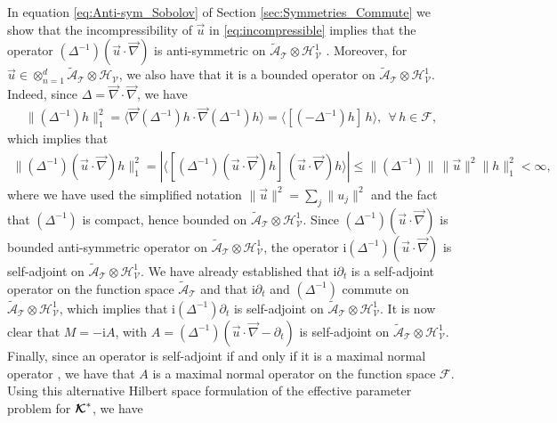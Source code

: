 \documentclass[11pt]{amsart}
\newcommand{\I}{\mathrm{i}}
\newcommand\Kbc{\mbox{\boldmath${\mathcal{K}}$}}
\newcommand{\Tc}{\mathcal{T}}
\newcommand{\Vc}{\mathcal{V}}
\newcommand{\Hc}{\mathcal{H}}
\newcommand{\Fc}{\mathcal{F}}
\newcommand{\As}{\mathscr{A}}
\begin{document}
In equation \eqref{eq:Anti-sym_Sobolov} of Section
\ref{sec:Symmetries_Commute} we show that the incompressibility of
$\vec{u}$ in \eqref{eq:incompressible} implies that the operator
$(\Delta^{-1})(\vec{u}\cdot\vec{\nabla})$ is anti-symmetric on
$\tilde{\As}_{\Tc}\otimes\Hc^1_{\Vc}$ \cite{Bhattacharya:AAP:1999:951}.
Moreover, for $\vec{u}\in\otimes_{n=1}^d\tilde{\As}_{\Tc}\otimes\Hc_{\Vc}$, we also have that 
it is a bounded operator on $\tilde{\As}_{\Tc}\otimes\Hc^1_{\Vc}$. Indeed,
since $\Delta=\vec{\nabla}\cdot\vec{\nabla}$, we have 
%
\begin{align}\label{eq:H1_L2}
  \|(\Delta^{-1})h\|_1^2=\langle\vec{\nabla}(\Delta^{-1})h\cdot\vec{\nabla}(\Delta^{-1})h\rangle=\langle[(-\Delta^{-1})h]\,h\rangle,
  \ \ \forall \,h\in\Fc,
\end{align}
%
which implies that
%
\begin{align}\label{eq:Bounded_A_Sobolov}
  \|(\Delta^{-1})(\vec{u}\cdot\vec{\nabla})h\|_1^2
    =|\langle[(\Delta^{-1})(\vec{u}\cdot\vec{\nabla})h]\, (\vec{u}\cdot\vec{\nabla})h \rangle|
   \leq\|(\Delta^{-1})\|\,\|\vec{u}\|^2\|h\|_1^2
   <\infty,
\end{align}
%
where we have used the simplified notation $\|\vec{u}\|^2=\sum_j\|u_j\|^2$
and the fact \cite{Stakgold:BVP:2000} that $(\Delta^{-1})$ is compact,
hence bounded on $\tilde{\As}_{\Tc}\otimes\Hc^1_{\Vc}$. Since
$(\Delta^{-1})(\vec{u}\cdot\vec{\nabla})$ is bounded anti-symmetric operator on
$\tilde{\As}_{\Tc}\otimes\Hc^1_{\Vc}$, the operator
$\I(\Delta^{-1})(\vec{u}\cdot\vec{\nabla})$ is self-adjoint on
$\tilde{\As}_{\Tc}\otimes\Hc^1_{\Vc}$. We have already
established that $\I\partial_t$ is a self-adjoint operator on the function
space $\tilde{\As}_{\Tc}$ and that $\I\partial_t$ and $(\Delta^{-1})$ commute on
$\tilde{\As}_{\Tc}\otimes\Hc^1_{\Vc}$, which implies that $\I(\Delta^{-1})\partial_t$ is
self-adjoint on $\tilde{\As}_{\Tc}\otimes\Hc^1_{\Vc}$. It is now clear that
$M=-\I A$, with $A=(\Delta^{-1})(\vec{u}\cdot\vec{\nabla}-\partial_t)$ is self-adjoint on
$\tilde{\As}_{\Tc}\otimes\Hc^1_{\Vc}$. Finally, since an operator is
self-adjoint if and only if it is a maximal normal operator
\cite{Stone:64}, we have that $A$ is a maximal normal operator on
the function space $\Fc$. Using this alternative Hilbert space
formulation of the effective parameter problem for $\Kbc^*$, we have
\end{document}
